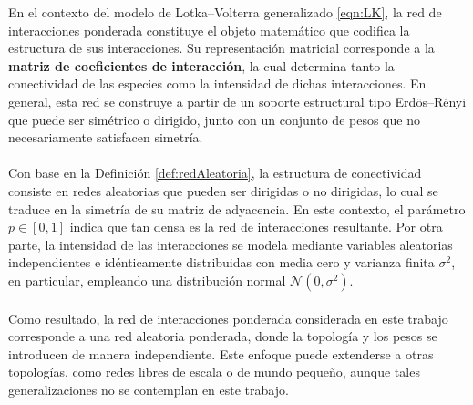 En el contexto del modelo de Lotka--Volterra generalizado \eqref{eqn:LK}, la red de interacciones ponderada constituye el objeto matemático que codifica la estructura de sus interacciones. Su representación matricial corresponde a la \textbf{matriz de coeficientes de interacción}, la cual determina tanto la conectividad de las especies como la intensidad de dichas interacciones. En general, esta red se construye a partir de un soporte estructural tipo Erdös–Rényi que puede ser simétrico o dirigido, junto con un conjunto de pesos que no necesariamente satisfacen simetría. \\
\\
Con base en la Definición \ref{def:redAleatoria}, la estructura de conectividad consiste en redes aleatorias que pueden ser dirigidas o no dirigidas, lo cual se traduce en la simetría de su matriz de adyacencia. En este contexto, el parámetro $p\in[0,1]$ indica que tan densa es la red de interacciones resultante. Por otra parte, la intensidad de las interacciones se modela mediante variables aleatorias independientes e idénticamente distribuidas con media cero y varianza finita $\sigma^2$, en particular, empleando una distribución normal $\mathcal{N}(0,\sigma^2)$.\\
\\
Como resultado, la red de interacciones ponderada considerada en este trabajo corresponde a una red aleatoria ponderada, donde la topología y los pesos se introducen de manera independiente. Este enfoque puede extenderse a otras topologías, como redes libres de escala o de mundo pequeño, aunque tales generalizaciones no se contemplan en este trabajo.
